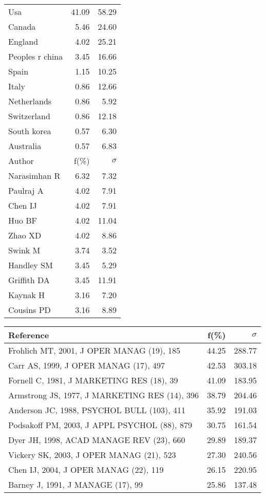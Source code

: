 \documentclass[a4paper,11pt]{report}
\begin{document}
\begin{landscape}
\begin{table}[!ht]
{\begin{tabular}{|l r r|}
Usa & 41.09 & 58.29\\
Canada & 5.46 & 24.60\\
England & 4.02 & 25.21\\
Peoples r china & 3.45 & 16.66\\
Spain & 1.15 & 10.25\\
Italy & 0.86 & 12.66\\
Netherlands & 0.86 & 5.92\\
Switzerland & 0.86 & 12.18\\
South korea & 0.57 & 6.30\\
Australia & 0.57 & 6.83\\
\hline
\hline
Author & f(\%) & $\sigma$\\
\hline
Narasimhan R & 6.32 & 7.32\\
Paulraj A & 4.02 & 7.91\\
Chen IJ & 4.02 & 7.91\\
Huo BF & 4.02 & 11.04\\
Zhao XD & 4.02 & 8.86\\
Swink M & 3.74 & 3.52\\
Handley SM & 3.45 & 5.29\\
Griffith DA & 3.45 & 11.91\\
Kaynak H & 3.16 & 7.20\\
Cousins PD & 3.16 & 8.89\\
\hline
\end{tabular}
}
{\scriptsize\begin{tabular}{|l r r|}
\hline
Reference & f(\%) & $\sigma$\\
\hline
Frohlich MT, 2001, J OPER MANAG (19), 185 & 44.25 & 288.77\\
Carr AS, 1999, J OPER MANAG (17), 497 & 42.53 & 303.18\\
Fornell C, 1981, J MARKETING RES (18), 39 & 41.09 & 183.95\\
Armstrong JS, 1977, J MARKETING RES (14), 396 & 38.79 & 204.46\\
Anderson JC, 1988, PSYCHOL BULL (103), 411 & 35.92 & 191.03\\
Podsakoff PM, 2003, J APPL PSYCHOL (88), 879 & 30.75 & 161.54\\
Dyer JH, 1998, ACAD MANAGE REV (23), 660 & 29.89 & 189.37\\
Vickery SK, 2003, J OPER MANAG (21), 523 & 27.30 & 240.56\\
Chen IJ, 2004, J OPER MANAG (22), 119 & 26.15 & 220.95\\
Barney J, 1991, J MANAGE (17), 99 & 25.86 & 137.48\\

\end{tabular}}
\end{table}
\end{landscape}
\end{document}
